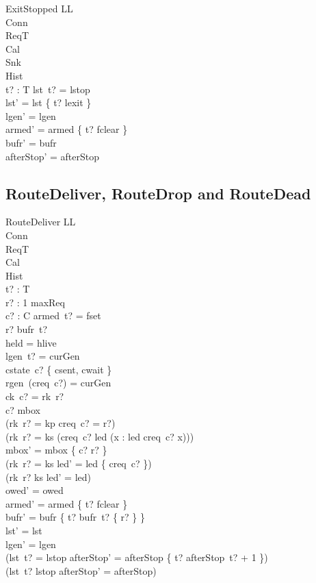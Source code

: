\documentclass[a4paper,10pt,fleqn]{article}
\begin{document}
\begin{schema}{ExitStopped}
  \Delta LL \\
  \Xi Conn \\
  \Xi ReqT \\
  \Xi Cal \\
  \Xi Snk \\
  \Xi Hist \\
  t? : T
\where
  lst~t? = lstop \\
  lst' = lst \oplus \{ t? \mapsto lexit \} \\
  lgen' = lgen \\
  armed' = armed \oplus \{ t? \mapsto fclear \} \\
  bufr' = bufr \\
  afterStop' = afterStop
\end{schema}

\subsection{RouteDeliver, RouteDrop and RouteDead}

\begin{schema}{RouteDeliver}
  \Delta LL \\
  \Xi Conn \\
  \Xi ReqT \\
  \Xi Cal \\
  \Xi Hist \\
  t? : T \\
  r? : 1 \upto maxReq \\
  c? : C
\where
  armed~t? = fset \\
  r? \in bufr~t? \\
  held = hlive \\
  lgen~t? = curGen \\
  cstate~c? \in \{ csent, cwait \} \\
  rgen~(creq~c?) = curGen \\
  ck~c? = rk~r? \\
  c? \notin \dom mbox \\
  (rk~r? = kp \implies creq~c? = r?) \\
  (rk~r? = ks \implies
    (creq~c? \in led \land (\forall x : led \spot creq~c? \leq x))) \\
  mbox' = mbox \cup \{ c? \mapsto r? \} \\
  (rk~r? = ks \implies led' = led \setminus \{ creq~c? \}) \\
  (rk~r? \neq ks \implies led' = led) \\
  owed' = owed \\
  armed' = armed \oplus \{ t? \mapsto fclear \} \\
  bufr' = bufr \oplus \{ t? \mapsto bufr~t? \setminus \{ r? \} \} \\
  lst' = lst \\
  lgen' = lgen \\
  (lst~t? = lstop \implies
    afterStop' = afterStop \oplus \{ t? \mapsto afterStop~t? + 1 \}) \\
  (lst~t? \neq lstop \implies afterStop' = afterStop)
\end{schema}
\end{document}
